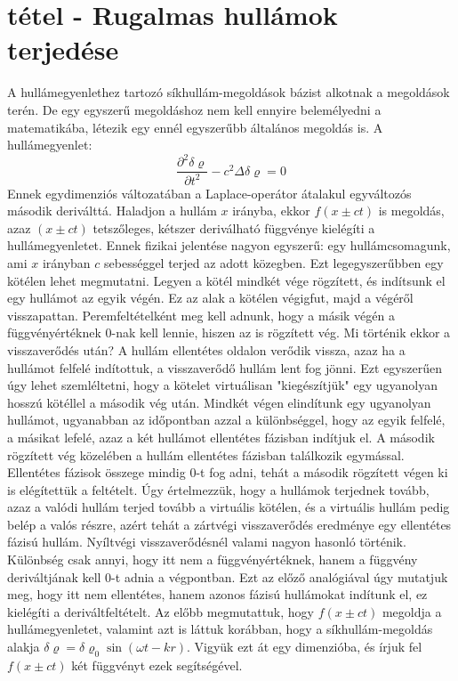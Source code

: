 \documentclass[a4paper,12pt]{article}
\begin{document}
\section{tétel - Rugalmas hullámok terjedése}
A hullámegyenlethez tartozó síkhullám-megoldások bázist alkotnak a megoldások terén. De egy egyszerű megoldáshoz nem kell ennyire belemélyedni a matematikába, létezik egy ennél egyszerűbb általános megoldás is. A hullámegyenlet:
\begin{equation}
\frac{\partial^2\delta\varrho}{\partial t^2}-c^2\Delta\delta\varrho=0
\end{equation}
Ennek egydimenziós változatában a Laplace-operátor átalakul egyváltozós második deriválttá. Haladjon a hullám $x$ irányba, ekkor $f(x\pm ct)$ is megoldás, azaz $(x\pm ct)$ tetszőleges, kétszer deriválható függvénye kielégíti a hullámegyenletet. Ennek fizikai jelentése nagyon egyszerű: egy hullámcsomagunk, ami $x$ irányban $c$ sebességgel terjed az adott közegben. Ezt legegyszerűbben egy kötélen lehet megmutatni. Legyen a kötél mindkét vége rögzített, és indítsunk el egy hullámot az egyik végén. Ez az alak a kötélen végigfut, majd a végéről visszapattan. Peremfeltételként meg kell adnunk, hogy a másik végén  a függvényértéknek 0-nak kell lennie, hiszen az is rögzített vég. Mi történik ekkor a visszaverődés után? A hullám ellentétes oldalon verődik vissza, azaz ha a hullámot felfelé indítottuk, a visszaverődő hullám lent fog jönni. Ezt egyszerűen úgy lehet szemléltetni, hogy a kötelet virtuálisan "kiegészítjük" egy ugyanolyan hosszú kötéllel a második vég után. Mindkét végen elindítunk egy ugyanolyan hullámot, ugyanabban az időpontban azzal a különbséggel, hogy az egyik felfelé, a másikat lefelé, azaz a két hullámot ellentétes fázisban indítjuk el. A második rögzített vég közelében a hullám ellentétes fázisban találkozik egymással. Ellentétes fázisok összege mindig 0-t fog adni, tehát a második rögzített végen ki is elégítettük a feltételt. Úgy értelmezzük, hogy a hullámok terjednek tovább, azaz a valódi hullám terjed tovább a virtuális kötélen, és a virtuális hullám pedig belép a valós részre, azért tehát a zártvégi visszaverődés eredménye egy ellentétes fázisú hullám.
Nyíltvégi visszaverődésnél valami nagyon hasonló történik. Különbség csak annyi, hogy itt nem a függvényértéknek, hanem a függvény deriváltjának kell 0-t adnia a végpontban. Ezt az előző analógiával úgy mutatjuk meg, hogy itt nem ellentétes, hanem azonos fázisú hullámokat indítunk el, ez kielégíti a deriváltfeltételt. 
Az előbb megmutattuk, hogy $f(x\pm ct)$ megoldja a hullámegyenletet, valamint azt is láttuk korábban, hogy a síkhullám-megoldás alakja $\delta\varrho=\delta\varrho_0\sin(\omega t-kr)$. Vigyük ezt át egy dimenzióba, és írjuk fel $f(x\pm ct)$ két függvényt ezek segítségével.
\end{document}
